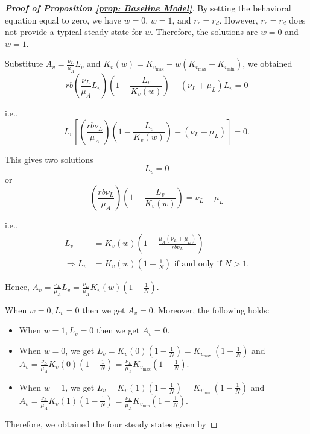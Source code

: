 \documentclass{article}
\theoremstyle{remark}
\theoremstyle{custom} %
\begin{document}
\begin{proof}[\textbf{Proof of Proposition \ref{prop: Baseline Model}}]


By setting the behavioral equation equal to zero, we have \(w = 0\), \(w = 1\), and $r_c=r_d$. However, $r_c=r_d$ does not provide a typical steady state for \(w\). Therefore, the solutions are \(w = 0\) and \(w = 1\).

Substitute \(A_v = \frac{\nu_L}{\mu_A} L_v\) and \(K_v(w) = K_{v_{\max}} - w (K_{v_{\max}} - K_{v_{\min}})\), we obtained \[
r b \left(\frac{\nu_L}{\mu_A} L_v \right) \left(1 - \frac{L_v}{K_v(w)}\right) - (\nu_L + \mu_L) L_v = 0
\]

i.e., \[
L_v \left[\left(\frac{r b \nu_L}{\mu_A}\right) \left(1 - \frac{L_v}{K_v(w)}\right) - (\nu_L + \mu_L)\right] = 0.
\]

This gives two solutions \[L_v = 0\] or\[
\left(\frac{r b \nu_L}{\mu_A}\right) \left(1 - \frac{L_v}{K_v(w)}\right) = \nu_L + \mu_L
\]


i.e.,  $$
\begin{aligned}
L_v & =K_v(w)\left(1-\frac{\mu_A\left(\nu_L+\mu_L\right)}{r b \nu_L}\right) \\
\Rightarrow L_v & =K_v(w)\left(1-\frac{1}{N}\right) \text { if and only if } N>1 .
\end{aligned}
$$


Hence, $A_v=\frac{\nu_L}{\mu_A} L_v=\frac{\nu_L}{\mu_A} K_v(w)\left(1-\frac{1}{N}\right).$

When $w=0, L_v=0$ then we get $A_v=0.$ Moreover, the following holds:

\begin{itemize}
\item When $w=1, L_v=0$ then we get $A_v=0.$

\item When $w=0$, we get $L_v=K_v(0)\left(1-\frac{1}{N}\right)=K_{v_{\text {max }}}\left(1-\frac{1}{N}\right)$ and
$
A_v=\frac{\nu_L}{\mu_A} K_v(0)\left(1-\frac{1}{N}\right)=\frac{\nu_L}{\mu_A} K_{v_{\max }}\left(1-\frac{1}{N}\right).
$

\item When $w=1$, we get $L_v=K_v(1)\left(1-\frac{1}{N}\right)=K_{v_{\text {min }}}\left(1-\frac{1}{N}\right)$ and
$
A_v=\frac{\nu_L}{\mu_A} K_v(1)\left(1-\frac{1}{N}\right)=\frac{\nu_L}{\mu_A} K_{v_{\min }}\left(1-\frac{1}{N}\right).
$
\end{itemize}

Therefore, we obtained the four steady states given by


\end{proof}
\end{document}

